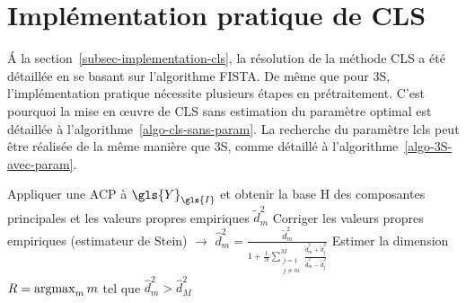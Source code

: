 \section{Implémentation pratique de CLS}\label{annexe-implementation-cls}

    \'A la section~\ref{subsec-implementation-cls}, la résolution de la méthode CLS a été détaillée en se basant sur l'algorithme FISTA. De même que pour 3S, l'implémentation pratique nécessite plusieurs étapes en prétraitement. C'est pourquoi la mise en \oe{}uvre de CLS sans estimation du paramètre optimal est détaillée à l'algorithme~\ref{algo-cls-sans-param}. La recherche du paramètre \gls{lcls} peut être réalisée de la même manière que 3S, comme détaillé à l'algorithme~\ref{algo-3S-avec-param}.

    \begin{normalalgorithme*}[t]
        \begin{minipage}{\textwidth}
            \begin{algorithm}[H]
                
                \medskip
                Appliquer une ACP à $\gls{Y}_{\gls{I}}$ et obtenir la base \gls{H} des composantes principales et les valeurs propres empiriques $\tilde{d}_m^2$\;
                Corriger les valeurs propres empiriques (estimateur de Stein) $\rightarrow$ $\hat{d}_m^2 = \frac{\tilde{d}^2_m}{1+ \frac{1}{N}\sum_{\substack{j=1\\j\neq m }}^M \frac{\tilde{d}^2_m+\tilde{d}^2_j}{\tilde{d}^2_m-\tilde{d}^2_j}}$\;
                Estimer la dimension $R = \argmax_m {m}$ tel que $\hat{d}_m^2 > \hat{d}_M^2$\;

                \medskip


                \medskip

\end{algorithm}
\end{minipage}
\end{normalalgorithme*}
